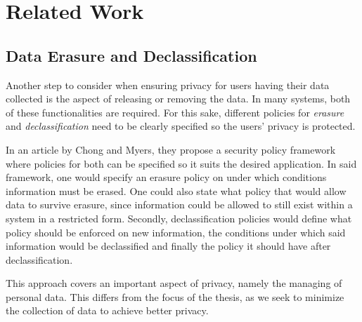 


\section{Related Work}

\subsection{Data Erasure and Declassification}



Another step to consider when ensuring privacy for users having their data collected is the aspect of releasing or removing the data. In many systems, both of these functionalities are required. For this sake, different policies for \textit{erasure} and \textit{declassification} need to be clearly specified so the users' privacy is protected. 


In an article by Chong and Myers\cite{chong2005language}, they propose a security policy framework where policies for both can be specified so it suits the desired application. In said framework, one would specify an erasure policy on under which conditions information must be erased. One could also state what policy that would allow data to survive erasure, since information could be allowed to still exist within a system in a restricted form. Secondly, declassification policies would define what policy should be enforced on new information, the conditions under which said information would be declassified and finally the policy it should have after declassification. 


This approach covers an important aspect of privacy, namely the managing of personal data. This differs from the focus of the thesis, as we seek to minimize the collection of data to achieve better privacy. %

